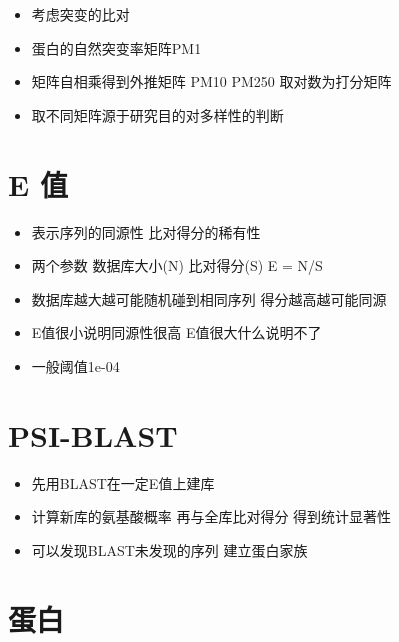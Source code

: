 \documentclass[]{book}
\providecommand{\tightlist}{%
  \setlength{\itemsep}{0pt}\setlength{\parskip}{0pt}}
\begin{document}
\begin{itemize}
\tightlist
\item
  考虑突变的比对
\item
  蛋白的自然突变率矩阵PM1
\item
  矩阵自相乘得到外推矩阵 PM10 PM250 取对数为打分矩阵
\item
  取不同矩阵源于研究目的对多样性的判断
\end{itemize}

\hypertarget{e-ux503c}{%
\section{E 值}\label{e-ux503c}}

\begin{itemize}
\tightlist
\item
  表示序列的同源性 比对得分的稀有性
\item
  两个参数 数据库大小(N) 比对得分(S) E = N/S
\item
  数据库越大越可能随机碰到相同序列 得分越高越可能同源
\item
  E值很小说明同源性很高 E值很大什么说明不了
\item
  一般阈值1e-04
\end{itemize}

\hypertarget{psi-blast}{%
\section{PSI-BLAST}\label{psi-blast}}

\begin{itemize}
\tightlist
\item
  先用BLAST在一定E值上建库
\item
  计算新库的氨基酸概率 再与全库比对得分 得到统计显著性
\item
  可以发现BLAST未发现的序列 建立蛋白家族
\end{itemize}

\hypertarget{ux86cbux767d}{%
\section{蛋白}\label{ux86cbux767d}}
\end{document}
